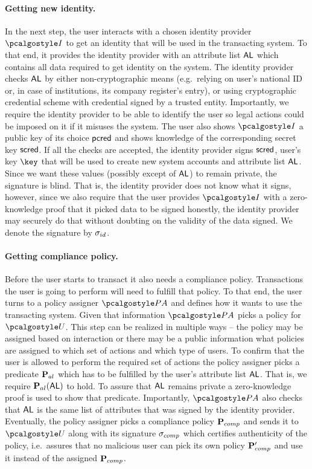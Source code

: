 \documentclass[runningheads,10pt]{llncs}
\numberwithin{equation}{section}
\begin{document}
\paragraph{Getting new identity.}
In the next step, the user interacts with a chosen identity provider $\idprov$ to get
an identity that will be used in the transacting system. To that end, it provides the
identity provider with an attribute list $\mathsf{AL}$ which contains all data required to
get identity on the system. The identity provider checks $\mathsf{AL}$ by either
non-cryptographic means (e.g.~relying on user's national ID or, in case of
institutions, its company register's entry), or using cryptographic credential scheme
with credential signed by a trusted entity. Importantly, we require the identity
provider to be able to identify the user so legal actions could be imposed on it if
it misuses the system. The user also shows $\idprov$ a public key of its choice
$\mathsf{pcred}$ and shows knowledge of the corresponding secret key $\mathsf{scred}$. If all the
checks are accepted, the identity provider signs $\mathsf{scred}$, user's key $\key$ that
will be used to create new system accounts and attribute list $\mathsf{AL}$. Since we want
these values (possibly except of $\mathsf{AL}$) to remain private, the signature is
blind. That is, the identity provider does not know what it signs, however, since we
also require that the user provides $\idprov$ with a zero-knowledge proof that it
picked data to be signed honestly, the identity provider may securely do that without
doubting on the validity of the data signed. We denote the signature by
$\sigma_{id}$.

\paragraph{Getting compliance policy.} Before the user starts to transact it also
needs a compliance policy. Transactions the user is going to perform will need to
fulfill that policy. To that end, the user turns to a policy assigner $\polas$ and
defines how it wants to use the transacting system. Given that information $\polas$
picks a policy for $\user$. This step can be realized in multiple ways -- the policy
may be assigned based on interaction or there may be a public information what
policies are assigned to which set of actions and which type of users. To confirm
that the user is allowed to perform the required set of actions the policy assigner
picks a predicate $\mathbf{P}_{al}$ which has to be fulfilled by the user's attribute list
$\mathsf{AL}$. That is, we require $\mathbf{P}_{al} (\mathsf{AL})$ to hold.  To assure that $\mathsf{AL}$ remains
private a zero-knowledge proof is used to show that predicate. Importantly, $\polas$
also checks that $\mathsf{AL}$ is the same list of attributes that was signed by the identity
provider. Eventually, the policy assigner picks a compliance policy $\mathbf{P}_{comp}$ and
sends it to $\user$ along with its signature $\sigma_{comp}$ which certifies
authenticity of the policy, i.e.~assures that no malicious user can pick its own
policy $\mathbf{P}_{comp}'$ and use it instead of the assigned $\mathbf{P}_{comp}$.
\end{document}
